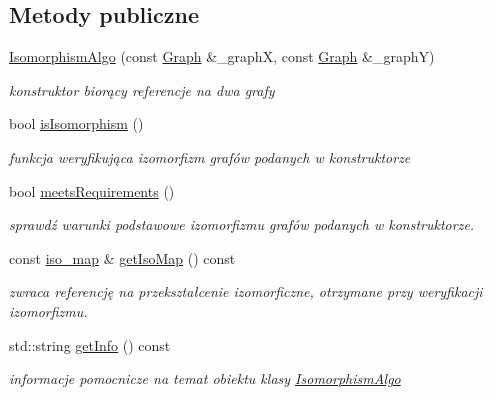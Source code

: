 \subsection*{Metody publiczne}
\begin{DoxyCompactItemize}
\item 
\hyperlink{classIsomorphismAlgo_a9ce685f18e7dc74ad6af1b70b8f1073e}{Isomorphism\-Algo} (const \hyperlink{classGraph}{Graph} \&\-\_\-graph\-X, const \hyperlink{classGraph}{Graph} \&\-\_\-graph\-Y)
\begin{DoxyCompactList}\small\item\em konstruktor biorący referencje na dwa grafy \end{DoxyCompactList}\item 
bool \hyperlink{classIsomorphismAlgo_a57a1df7c1d6b397a43b93f69e51a6849}{is\-Isomorphism} ()
\begin{DoxyCompactList}\small\item\em funkcja weryfikująca izomorfizm grafów podanych w konstruktorze \end{DoxyCompactList}\item 
bool \hyperlink{classIsomorphismAlgo_ad129995900091c355428eab6418f1a56}{meets\-Requirements} ()
\begin{DoxyCompactList}\small\item\em sprawdź warunki podstawowe izomorfizmu grafów podanych w konstruktorze. \end{DoxyCompactList}\item 
const \hyperlink{classIsomorphismAlgo_ad95c1101cd4ef09d4a581d8fbe44aff0}{iso\-\_\-map} \& \hyperlink{classIsomorphismAlgo_a043622f6de8535919784045ca8cc97cf}{get\-Iso\-Map} () const 
\begin{DoxyCompactList}\small\item\em zwraca referencję na przekształcenie izomorficzne, otrzymane przy weryfikacji izomorfizmu. \end{DoxyCompactList}\item 
std\-::string \hyperlink{classIsomorphismAlgo_a6af4fec0a6fc1877427d637bcd84a1ab}{get\-Info} () const 
\begin{DoxyCompactList}\small\item\em informacje pomocnicze na temat obiektu klasy \hyperlink{classIsomorphismAlgo}{Isomorphism\-Algo} \end{DoxyCompactList}\end{DoxyCompactItemize}
